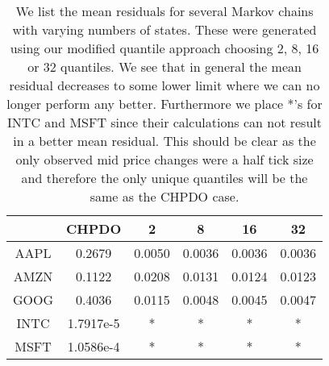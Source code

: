 \begin{table}[htpb]
    \centering
    \begin{tabular}{c|c|c|c|c|c}
     & CHPDO & 2 & 8 & 16 & 32\\
    \hline
    AAPL & 0.2679 & 0.0050 & 0.0036 & 0.0036 & 0.0036\\
    AMZN & 0.1122 & 0.0208 & 0.0131 & 0.0124 & 0.0123\\
    GOOG & 0.4036 & 0.0115 & 0.0048 & 0.0045 & 0.0047\\
    INTC & 1.7917e-5 & * & * & * & *\\
    MSFT & 1.0586e-4 & * & * & * & *
    \end{tabular}
    \caption{\label{table:meanres} We list the mean residuals for several Markov chains with varying numbers of states. These were generated using our modified quantile approach choosing 2, 8, 16 or 32 quantiles. We see that in general the mean residual decreases to some lower limit where we can no longer perform any better. Furthermore we place *'s for INTC and MSFT since their calculations can not result in a better mean residual. This should be clear as the only observed mid price changes were a half tick size and therefore the only unique quantiles will be the same as the CHPDO case.}
    
\end{table}